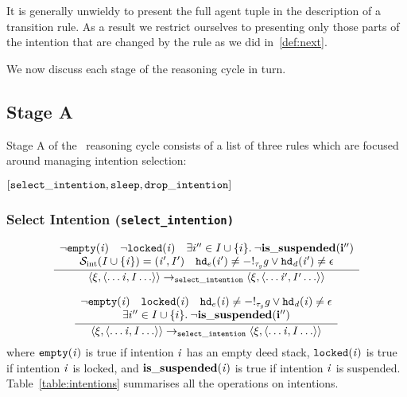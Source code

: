 It is generally unwieldy to present the full agent tuple in the description of a transition rule.  As a result we restrict ourselves to presenting only those parts of the intention that are changed by the rule as we did in~\eqref{def:next}.

We now discuss each stage of the reasoning cycle in turn.
\subsection{Stage A}

Stage A of the \gwendolen\ reasoning cycle consists of a list of three rules which are focused around managing intention selection:

$[ {\tt select\_intention}, {\tt sleep}, {\tt drop\_intention} ]$

\subsubsection*{Select Intention (\tt{select\_intention})}

\begin{equation}
\frac{
\begin{array}{c}
\neg {\tt empty}(\mathit{i})
\quad
\neg {\tt locked}(\mathit{i}) \quad
\exists i'' \in I \cup \{i\}. \: \neg \bf is\_suspended(i'') \\
\mathcal{S}_{\mathrm{int}}(\mathit{I} \cup \{\mathit{i}\}) = (\mathit{i}', \mathit{I}') 
\quad {\tt hd}_e(\mathit{i}') \neq
\mathit{-!_{\mathit{\tau_{\mathit{g}}}}\mathit{g}} \vee 
\mathit{{\tt hd}_d}(\mathit{i}') \neq \epsilon
\end{array}
}{
\langle \xi, \langle \ldots \mathit{i}, \mathit{I} \ldots \rangle \rangle
\rightarrow_{\tt select\_intention} \langle \xi, \langle \ldots \mathit{i}', \mathit{I}' \ldots \rangle \rangle
}
\end{equation}

\begin{equation}
\frac{
\begin{array}{c}
\neg {\tt empty}(\mathit{i})
\quad
{\tt locked}(\mathit{i}) 
\quad {\tt hd}_e(\mathit{i}) \neq
\mathit{-!_{\mathit{\tau_{\mathit{g}}}}\mathit{g}} \vee 
\mathit{{\tt hd}_d}(\mathit{i}) \neq \epsilon
\\
\exists i'' \in I \cup \{i\}. \: \neg \bf is\_suspended(i'') 
\end{array}
}{
\langle \xi, \langle \ldots \mathit{i}, \mathit{I} \ldots \rangle \rangle
\rightarrow_{\tt select\_intention} \langle \xi, \langle \ldots \mathit{i}, \mathit{I} \ldots \rangle \rangle
}
\end{equation}
where ${\tt empty}(\mathit{i})$ is true if intention $\mathit{i}$ has an empty deed stack,
${\tt locked}(\mathit{i})$ is true if intention $\mathit{i}$ is locked,
and $\bf is\_suspended(\mathit{i})$ is true if intention $\mathit{i}$ is suspended.
Table~\ref{table:intentions} summarises all the operations on intentions.

